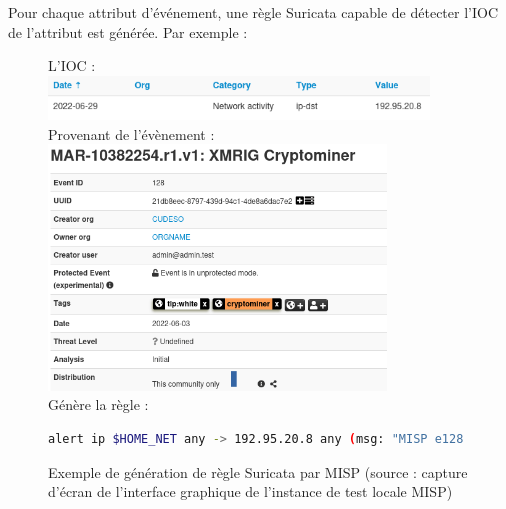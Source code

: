 \vspace{1em}

Pour chaque attribut d'événement, une règle Suricata capable de détecter l'IOC de l'attribut est générée. Par exemple :\\

\newpage

\begin{figure}[h]%
    \center%
    L'IOC :\\
    \vspace{0.5em}
    \includegraphics[width=0.9\textwidth]{assets/IP.png}
    \vspace{1em}
    \\Provenant de l'évènement :\\
    \vspace{0.5em}
    \includegraphics[width=0.8\textwidth]{assets/MispEventRule.png}
    \vspace{1em}
    \\Génère la règle :
    \begin{lstlisting}[language=bash]
alert ip $HOME_NET any -> 192.95.20.8 any (msg: "MISP e128 [] Outgoing To IP: 192.95.20.8"; classtype:trojan-activity; sid:2696602; rev:1; priority:4; reference:url,https://192.168.215.128/events/view/128;)
\end{lstlisting}
    
    \caption[Exemple de génération de règle Suricata par MISP (source : capture d'écran de l'interface graphique de l'instance de test locale MISP)]{Exemple de génération de règle Suricata par MISP (source : capture d'écran de l'interface graphique de l'instance de test locale MISP)}\label{fig:IP}
\end{figure}

